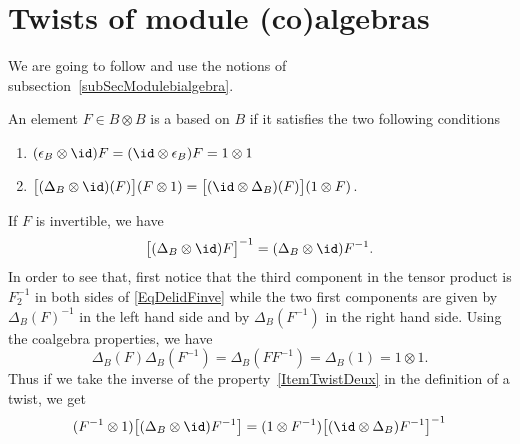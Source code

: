
\section{Twists of module (co)algebras}
\label{SecTheoryTwist}

We are going to follow \cite{GiaquintoZhangTwist} and use the notions of subsection~\ref{subSecModulebialgebra}.
\begin{definition}	\label{DefTwist}
	An element $F\in B\otimes B$ is a  based on $B$ if it satisfies the two following conditions
	\begin{enumerate}

		\item\label{ItemTwistUn}
			$(\epsilon_B\otimes \id)F=(\id\otimes \epsilon_B)F=1\otimes 1$
		\item\label{ItemTwistDeux}
			$\big[ (\Delta_B\otimes\id)(F) \big](F\otimes 1)=\big[ (\id\otimes\Delta_B)(F) \big](1\otimes F)$.

	\end{enumerate}
\end{definition}
If $F$ is invertible, we have
\begin{equation}		\label{EqDelidFinve}
	\big[ (\Delta_B\otimes\id)F\big]^{-1}=(\Delta_B\otimes\id)F^{-1}.
\end{equation}
In order to see that, first notice that the third component in the tensor product is $F_2^{-1}$ in both sides of \eqref{EqDelidFinve} while the two first components are given by $\Delta_B(F)^{-1}$ in the left hand side and by $\Delta_B(F^{-1})$ in the right hand side. Using the coalgebra properties, we have
\begin{equation}
	\Delta_B(F)\Delta_B(F^{-1})=\Delta_B(FF^{-1})=\Delta_B(1)=1\otimes 1.
\end{equation}
Thus if we take the inverse of the property~\ref{ItemTwistDeux} in the definition of a twist, we get
\begin{equation}		\label{EqFemuVaLeLem}
	(F^{-1}\otimes 1)\big[ (\Delta_B\otimes\id)F^{-1} \big]=(1\otimes F^{-1})\big[ (\id\otimes\Delta_B)F^{-1} \big]^{-1}
\end{equation}


